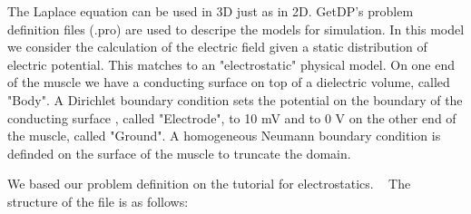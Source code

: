 \documentclass[preprint,journal]{vgtc}       %
\begin{document}
The Laplace equation can be used in 3D just as in 2D. 
GetDP's problem definition files (.pro) are used to descripe the models for simulation. 
In this model we consider the calculation of the electric field given a static distribution of electric potential. 
This matches to an "electrostatic" physical model. 
On one end of the muscle we have a conducting surface on top of a dielectric volume, called "Body".
A Dirichlet boundary condition sets the potential on the boundary of the conducting surface , called "Electrode", to 10 mV and to 0 V on the other end of the muscle, called "Ground".
A homogeneous Neumann boundary condition is definded on the surface of the muscle to truncate the domain.

We based our problem definition on the tutorial for electrostatics. ~\cite{Geuzaine2009}
The structure of the file is as follows:
\end{document}
